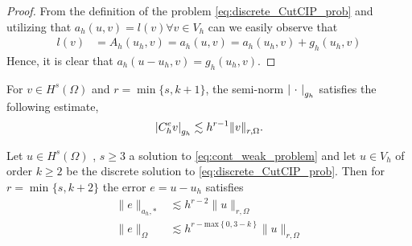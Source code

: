 \begin{proof}
   From the definition of the problem \eqref{eq:discrete_CutCIP_prob} and utilizing that $a_{h}( u,v) = l(v ) \forall v \in V_{h} $ can we easily observe that \[
       \begin{split}
   l(v ) & =  A_{h}( u_{h},v) =  a_{h}( u,v)  = a_{h}( u_{h},v)+g_{h}( u_{h},v)
       \end{split}
   \]
    Hence, it is clear that $a_{h}( u -  u_{h}, v) = g_{h}( u_{h},v)  $.
\end{proof}

\begin{assumption}[EP2]
    \label{as:bi_EP2}
    For $v \in H^{s}( \Omega ) $ and $r = \min \{s,k+1 \} $, the semi-norm $\left\lvert  \ \cdot \   \right\rvert_{g_{h}} $ satisfies the following estimate, \[
    \left\lvert  C _{h}^{e} v  \right\rvert _{g_{h}} \lesssim  h^{r-1} \| v \|_{ r,\Omega  }^{  }.
    \]
\end{assumption}


\begin{theorem}
    \label{thm:apriori_result}
    Let $u \in H^{s}( \Omega ) $ , $s\ge 3$ a solution to \eqref{eq:cont_weak_problem} and let $u \in V_{h}$ of order $k\ge 2$ be the discrete solution to \eqref{eq:discrete_CutCIP_prob}. Then for $r = \min_{}\{s, k+2\} $ the error $e = u - u_{h}$ satisfies
    \begin{align}
        \label{eq:bi_apriori_1}
            \| e \|_{ a_{h},* }^{  } &\lesssim   h^{r-2} \| u \|_{ r,\Omega  }^{  }\\
        \label{eq:bi_apriori_2}
        \| e \|_{ \Omega  }^{  } &\lesssim   h^{r-\mathrm{max}\left\{ 0, 3-k \right\} } \| u \|_{ r,\Omega  }^{  }
    \end{align}

\end{theorem}

